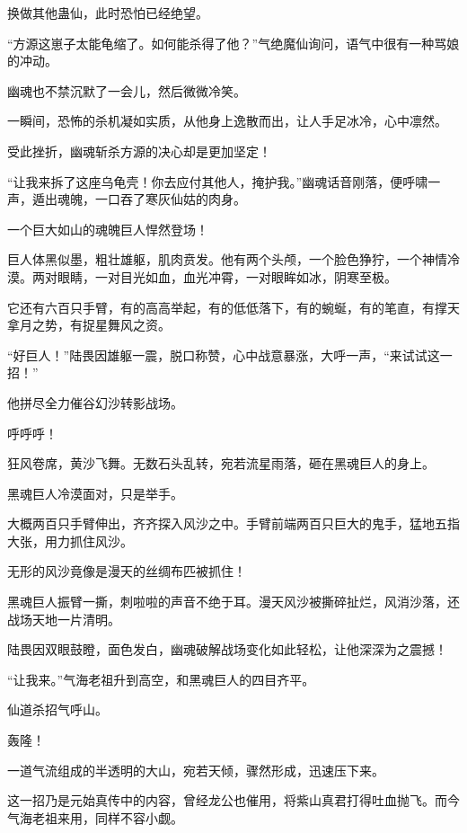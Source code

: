
\begin{this_body}

换做其他蛊仙，此时恐怕已经绝望。

“方源这崽子太能龟缩了。如何能杀得了他？”气绝魔仙询问，语气中很有一种骂娘的冲动。

幽魂也不禁沉默了一会儿，然后微微冷笑。

一瞬间，恐怖的杀机凝如实质，从他身上逸散而出，让人手足冰冷，心中凛然。

受此挫折，幽魂斩杀方源的决心却是更加坚定！

“让我来拆了这座乌龟壳！你去应付其他人，掩护我。”幽魂话音刚落，便呼啸一声，遁出魂魄，一口吞了寒灰仙姑的肉身。

一个巨大如山的魂魄巨人悍然登场！

巨人体黑似墨，粗壮雄躯，肌肉贲发。他有两个头颅，一个脸色狰狞，一个神情冷漠。两对眼睛，一对目光如血，血光冲霄，一对眼眸如冰，阴寒至极。

它还有六百只手臂，有的高高举起，有的低低落下，有的蜿蜒，有的笔直，有撑天拿月之势，有捉星舞风之资。

“好巨人！”陆畏因雄躯一震，脱口称赞，心中战意暴涨，大呼一声，“来试试这一招！”

他拼尽全力催谷幻沙转影战场。

呼呼呼！

狂风卷席，黄沙飞舞。无数石头乱转，宛若流星雨落，砸在黑魂巨人的身上。

黑魂巨人冷漠面对，只是举手。

大概两百只手臂伸出，齐齐探入风沙之中。手臂前端两百只巨大的鬼手，猛地五指大张，用力抓住风沙。

无形的风沙竟像是漫天的丝绸布匹被抓住！

黑魂巨人振臂一撕，刺啦啦的声音不绝于耳。漫天风沙被撕碎扯烂，风消沙落，还战场天地一片清明。

陆畏因双眼鼓瞪，面色发白，幽魂破解战场变化如此轻松，让他深深为之震撼！

“让我来。”气海老祖升到高空，和黑魂巨人的四目齐平。

仙道杀招气呼山。

轰隆！

一道气流组成的半透明的大山，宛若天倾，骤然形成，迅速压下来。

这一招乃是元始真传中的内容，曾经龙公也催用，将紫山真君打得吐血抛飞。而今气海老祖来用，同样不容小觑。


\end{this_body}
